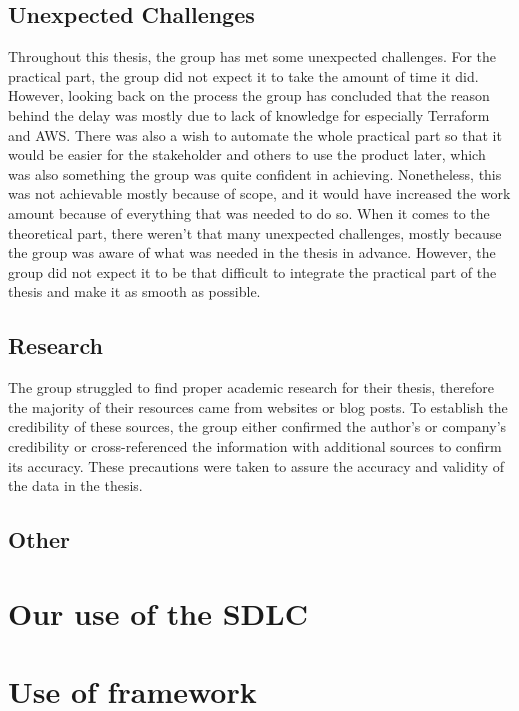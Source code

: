 \subsection{Unexpected Challenges}
Throughout this thesis, the group has met some unexpected challenges. For the practical part, the group did not expect it to take the amount of time it did. However, looking back on the process the group has concluded that the reason behind the delay was mostly due to lack of knowledge for especially Terraform and AWS. There was also a wish to automate the whole practical part so that it would be easier for the stakeholder and others to use the product later, which was also something the group was quite confident in achieving. Nonetheless, this was not achievable mostly because of scope, and it would have increased the work amount because of everything that was needed to do so. When it comes to the theoretical part, there weren't that many unexpected challenges, mostly because the group was aware of what was needed in the thesis in advance. However, the group did not expect it to be that difficult to integrate the practical part of the thesis and make it as smooth as possible.

\subsection{Research}
The group struggled to find proper academic research for their thesis, therefore the majority of their resources came from websites or blog posts. To establish the credibility of these sources, the group either confirmed the author's or company's credibility or cross-referenced the information with additional sources to confirm its accuracy. These precautions were taken to assure the accuracy and validity of the data in the thesis.  


\subsection{Other}

\section{Our use of the SDLC} %

\section{Use of framework} %



